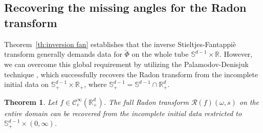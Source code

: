 \documentclass[11pt,reqno]{amsart}
\theoremstyle{plain}
\newtheorem{theorem}{Theorem}[section]
\theoremstyle{definition}
\numberwithin{equation}{section}
\newcommand{\R}{\mathbb{R}}
\begin{document}
\subsection{Recovering the missing angles for the Radon transform}
Theorem~\ref{th:inversion fan} establishes that the inverse Stieltjes-Fantappi{\`e} transform generally demands data for $\widetilde{\Phi}$ on the whole tube $\mathbb S^{d-1}\times \mathbb{R}$. However, we can overcome this global requirement by utilizing the Palamodov-Denisjuk technique \cite{PD88}, which successfully recovers the Radon transform from the incomplete initial data on $\mathbb S^{d-1}_+\times \R_+$, where $\mathbb S^{d-1}_+=\mathbb S^{d-1}\cap\R^d_+$.

\begin{theorem}
    Let $f\in\mathcal C^\infty_c(\R^d_+)$. The full Radon transform $\mathcal R(f)(\omega,s)$ on the entire domain can be recovered from the incomplete initial data restricted to $\mathbb S^{d-1}_+ \times (0, \infty)$.
\end{theorem}
\end{document}
